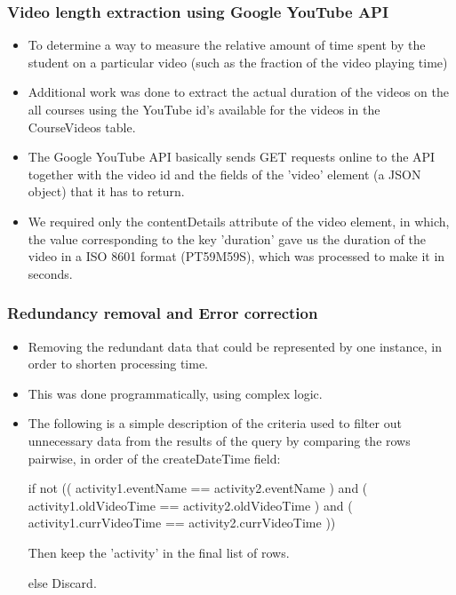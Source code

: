 \documentclass[12pt,xcolor=dvipsnames]{beamer}
\begin{document}
\begin{frame}[t]
\frametitle{Video length extraction using Google YouTube API}

\begin{itemize}
\item To determine a way to measure the relative amount of time spent by the student on a particular video (such as the fraction of the video playing time)

\item Additional work was done to extract the actual duration of the videos on the all courses using the YouTube id's available for the videos in the CourseVideos table.

\item The Google YouTube API basically sends GET requests online to the API together with the video id and the fields of the 'video' element (a JSON object) that it has to return.

\item We required only the contentDetails attribute of the video element, in which, the value corresponding to the key 'duration' gave us the duration of the video in a ISO 8601 format (PT59M59S), which was processed to make it in seconds.

\end{itemize}

\end{frame}

\begin{frame}[t]
\frametitle{Redundancy removal and Error correction}

\begin{itemize}
\item Removing the redundant data that could be represented by one instance, in order to shorten processing time.
\item This was done programmatically, using complex logic.
\item The following is a simple description of the criteria used to filter out unnecessary data from the results of the query by comparing the rows pairwise, in order of the createDateTime field:


if not (( activity1.eventName == activity2.eventName ) and 	( activity1.oldVideoTime == activity2.oldVideoTime ) and 	( activity1.currVideoTime == activity2.currVideoTime ))

		Then keep the 'activity' in the final list of rows.

else Discard.


\end{itemize}

\end{frame}
\end{document}
